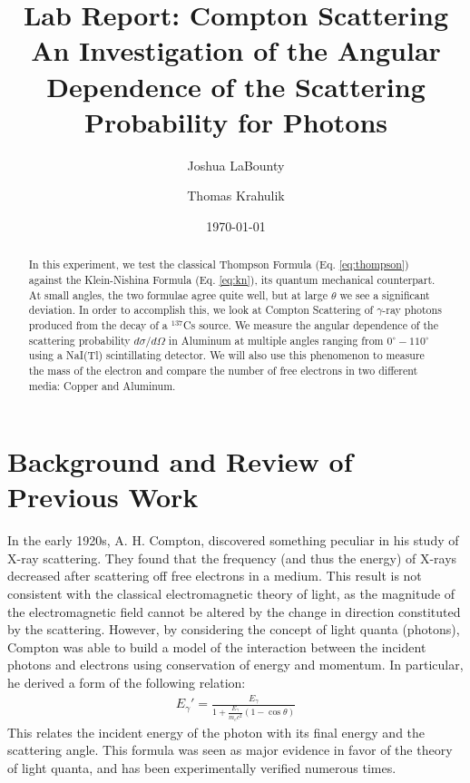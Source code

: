 \documentclass[%
 reprint,
 amsmath,amssymb,
 aps,
 pra,
]{revtex4-1}
\begin{document}

\title{\textbf{Lab Report: Compton Scattering} \\ \small{An Investigation of the Angular Dependence of the Scattering Probability for Photons}}
\author{Joshua LaBounty}
\author{Thomas Krahulik}

\date{\today}

\begin{abstract}
	In this experiment, we test the classical Thompson Formula (Eq. \ref{eq:thompson}) against the Klein-Nishina Formula (Eq. \ref{eq:kn}), its quantum mechanical counterpart. At small angles, the two formulae agree quite well, but at large $\theta$ we see a significant deviation. In order to accomplish this, we look at Compton Scattering of $\gamma$-ray photons produced from the decay of a $^{137}$Cs source. We measure the angular dependence of the scattering probability $d\sigma / d\Omega$ in Aluminum at multiple angles ranging from $0^\circ - 110^\circ$ using a NaI(Tl) scintillating detector. We will also use this phenomenon to measure the mass of the electron and compare the number of free electrons in two different media: Copper and Aluminum.
\end{abstract}
\maketitle

\section{Background and Review of Previous Work}

In the early 1920s, A. H. Compton, discovered something peculiar in his study of X-ray scattering. They found that the frequency (and thus the energy) of X-rays decreased after scattering off free electrons in a medium. This result is not consistent with the classical electromagnetic theory of light, as the magnitude of the electromagnetic field cannot be altered by the change in direction constituted by the scattering. However, by considering the concept of light quanta (photons), Compton was able to build a model of the interaction between the incident photons and electrons using conservation of energy and momentum. In particular, he derived a form of the following relation:
\begin{gather}\label{eq:energy_scatter}
	E_\gamma ' = \frac{E_\gamma}{1 + \frac{E_\gamma}{m_e c^2} (1 - \cos{\theta})}
\end{gather}
This relates the incident energy of the photon with its final energy and the scattering angle. This formula was seen as major evidence in favor of the theory of light quanta, and has been experimentally verified numerous times.
\end{document}
